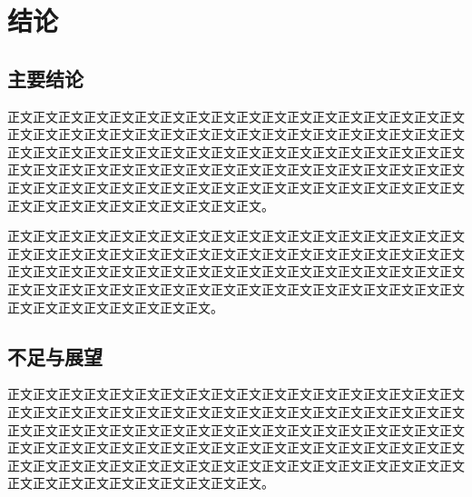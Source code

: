 \chapter{结论}\label{chap:conclusion}
\section{主要结论}
正文正文正文正文正文正文正文正文正文正文正文正文正文正文正文正文正文正文正文正文正文正文正文正文正文正文正文正文正文正文正文正文正文正文正文正文正文正文正文正文正文正文正文正文正文正文正文正文正文正文正文正文正文正文正文正文正文正文正文正文正文正文正文正文正文正文正文正文正文正文正文正文正文正文正文正文正文正文正文正文正文正文正文正文正文正文正文正文正文正文正文正文正文正文正文正文正文正文正文正文。

正文正文正文正文正文正文正文正文正文正文正文正文正文正文正文正文正文正文正文正文正文正文正文正文正文正文正文正文正文正文正文正文正文正文正文正文正文正文正文正文正文正文正文正文正文正文正文正文正文正文正文正文正文正文正文正文正文正文正文正文正文正文正文正文正文正文正文正文正文正文正文正文正文正文正文正文正文正文正文正文。

\section{不足与展望}
正文正文正文正文正文正文正文正文正文正文正文正文正文正文正文正文正文正文正文正文正文正文正文正文正文正文正文正文正文正文正文正文正文正文正文正文正文正文正文正文正文正文正文正文正文正文正文正文正文正文正文正文正文正文正文正文正文正文正文正文正文正文正文正文正文正文正文正文正文正文正文正文正文正文正文正文正文正文正文正文正文正文正文正文正文正文正文正文正文正文正文正文正文正文正文正文正文正文正文正文。

